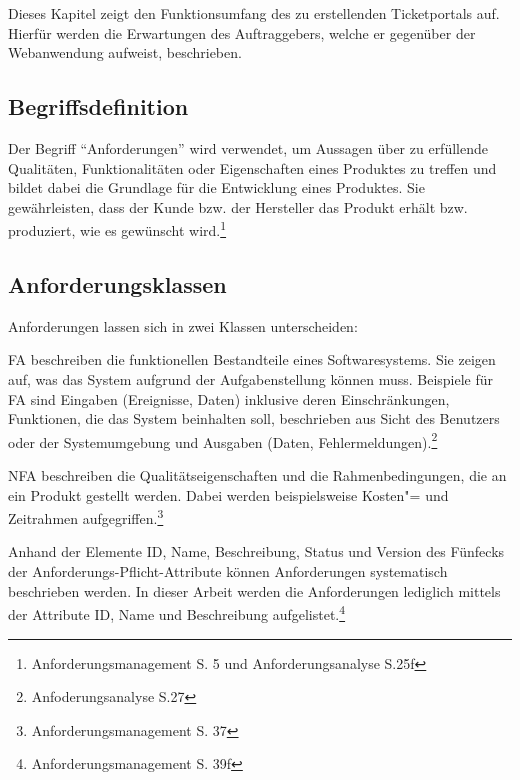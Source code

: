 Dieses Kapitel zeigt den Funktionsumfang des zu erstellenden Ticketportals auf.
Hierfür werden die Erwartungen des Auftraggebers, welche er gegenüber der Webanwendung aufweist, beschrieben.

\subsection{Begriffsdefinition}

Der Begriff \enquote{Anforderungen} wird verwendet, um Aussagen über zu erfüllende Qualitäten, Funktionalitäten oder Eigenschaften eines Produktes zu treffen und bildet dabei die Grundlage für die Entwicklung eines Produktes.
Sie gewährleisten, dass der Kunde bzw. der Hersteller das Produkt erhält bzw. produziert, wie es gewünscht wird.\footnote{Anforderungsmanagement S. 5 und Anforderungsanalyse S.25f}

\subsection{Anforderungsklassen}

Anforderungen lassen sich in zwei Klassen unterscheiden:

\ac{FA} beschreiben die funktionellen Bestandteile eines Softwaresystems.
Sie zeigen auf, was das System aufgrund der Aufgabenstellung können muss.
Beispiele für \ac{FA} sind Eingaben (Ereignisse, Daten) inklusive deren Einschränkungen, Funktionen, die das System beinhalten soll, beschrieben aus Sicht des Benutzers oder der Systemumgebung und Ausgaben (Daten, Fehlermeldungen).\footnote{Anfoderungsanalyse S.27}

\ac{NFA} beschreiben die Qualitätseigenschaften und die Rahmenbedingungen, die an ein Produkt gestellt werden.
Dabei werden beispielsweise Kosten"= und Zeitrahmen aufgegriffen.\footnote{Anforderungsmanagement S. 37}

Anhand der Elemente ID, Name, Beschreibung, Status und Version des Fünfecks der Anforderungs-Pflicht-Attribute können Anforderungen systematisch beschrieben werden.
In dieser Arbeit werden die Anforderungen lediglich mittels der Attribute ID, Name und Beschreibung aufgelistet.\footnote{Anforderungsmanagement S. 39f}


